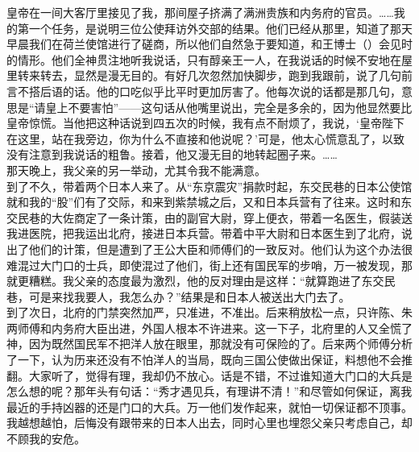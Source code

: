 皇帝在一间大客厅里接见了我，那间屋子挤满了满洲贵族和内务府的官员。……我的第一个任务，是说明三位公使拜访外交部的结果。他们已经从那里，知道了那天早晨我们在荷兰使馆进行了磋商，所以他们自然急于要知道，和王博士（）会见时的情形。他们全神贯注地听我说话，只有醇亲王一人，在我说话的时候不安地在屋里转来转去，显然是漫无目的。有好几次忽然加快脚步，跑到我跟前，说了几句前言不搭后语的话。他的口吃似乎比平时更加厉害了。他每次说的话都是那几句，意思是“请皇上不要害怕”——这句话从他嘴里说出，完全是多余的，因为他显然要比皇帝惊慌。当他把这种话说到四五次的时候，我有点不耐烦了，我说，‘皇帝陛下在这里，站在我旁边，你为什么不直接和他说呢？’可是，他太心慌意乱了，以致没有注意到我说话的粗鲁。接着，他又漫无目的地转起圈子来。……\\

那天晚上，我父亲的另一举动，尤其令我不能满意。\\

到了不久，带着两个日本人来了。从“东京震灾”捐款时起，东交民巷的日本公使馆就和我的“股”们有了交际，和来到紫禁城之后，又和日本兵营有了往来。这时和东交民巷的大佐商定了一条计策，由的副官大尉，穿上便衣，带着一名医生，假装送我进医院，把我运出北府，接进日本兵营。带着中平大尉和日本医生到了北府，说出了他们的计策，但是遭到了王公大臣和师傅们的一致反对。他们认为这个办法很难混过大门口的士兵，即使混过了他们，街上还有国民军的步哨，万一被发现，那就更糟糕。我父亲的态度最为激烈，他的反对理由是这样：“就算跑进了东交民巷，可是来找我要人，我怎么办？”结果是和日本人被送出大门去了。\\

到了次日，北府的门禁突然加严，只准进，不准出。后来稍放松一点，只许陈、朱两师傅和内务府大臣出进，外国人根本不许进来。这一下子，北府里的人又全慌了神，因为既然国民军不把洋人放在眼里，那就没有可保险的了。后来两个师傅分析了一下，认为历来还没有不怕洋人的当局，既向三国公使做出保证，料想他不会推翻。大家听了，觉得有理，我却仍不放心。话是不错，不过谁知道大门口的大兵是怎么想的呢？那年头有句话：“秀才遇见兵，有理讲不清！”和尽管如何保证，离我最近的手持凶器的还是门口的大兵。万一他们发作起来，就怕一切保证都不顶事。我越想越怕，后悔没有跟带来的日本人出去，同时心里也埋怨父亲只考虑自己，却不顾我的安危。\\

